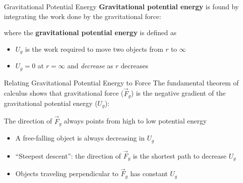 \documentclass[12pt,compress,aspectratio=169]{beamer}
\begin{document}
\begin{frame}{Gravitational Potential Energy}
  \textbf{Gravitational potential energy} is found by integrating the work
  done by the gravitational force:


  where the \textbf{gravitational potential energy} is defined as
  
  \begin{itemize}
  \item $U_g$ is the work required to move two objects from $r$ to $\infty$
  \item $U_g=0$ at $r=\infty$ and \emph{decrease} as $r$ decreases
  \end{itemize}
\end{frame}



\begin{frame}{Relating Gravitational Potential Energy to Force}
  The fundamental theorem of calculus shows that gravitational force
  ($\vec F_g$) is the negative gradient of the gravitational potential energy
  ($U_g$):
  

  The direction of $\vec F_g$ always points from high to low potential energy
  \begin{itemize}
  \item A free-falling object is always decreasing in $U_g$
  \item ``Steepest descent'': the direction of $\vec F_g$ is the shortest path
    to decrease $U_g$ 
  \item Objects traveling perpendicular to $\vec F_g$ has constant $U_g$
  \end{itemize}
\end{frame}
\end{document}
